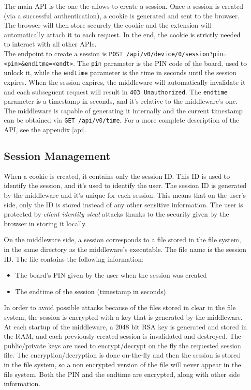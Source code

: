 The main API is the one the allows to create a session. Once a session is created (via a successful authentication), a cookie is generated and sent to the browser. The browser will then store securely the cookie and the extension will automatically attach it to each request. In the end, the cookie is strictly needed to interact with all other APIs.\\

The endpoint to create a session is \texttt{POST /api/v0/device/0/session?pin=<pin>\&enditme=<endt>}. The \texttt{pin} parameter is the PIN code of the board, used to unlock it, while the \texttt{endtime} parameter is the time in seconds until the session expires. When the session expires, the middleware will automatically invalidate it and each subseguent request will result in \texttt{403 Unauthorized}. The \texttt{endtime} parameter is a timestamp in seconds, and it's relative to the middleware's one. The middleware is capable of generating it internally and the current timestamp can be obtained via \texttt{GET /api/v0/time}. For a more complete description of the API, see the appendix \ref{api}.

\subsection{Session Management}
When a cookie is created, it contains only the session ID. This ID is used to identify the session, and it's used to identify the user. The session ID is generated by the middleware and it's unique for each session. This means that on the user's side, only the ID is stored instead of any other sensitive information. The user is protected by \textit{client identity steal} attacks thanks to the security given by the browser in storing it locally.

On the middleware side, a session corresponds to a file stored in the file system, in the same directory as the middleware's executable. The file name is the session ID. The file contains the following information:

\begin{itemize}
    \item The board's PIN given by the user when the session was created
    \item The endtime of the session (timestamp in seconds)
\end{itemize}

In order to avoid possible attacks because of the files stored in clear in the file system, the session is encrypted with a key that is generated by the middleware. At each startup of the middleware, a 2048 bit RSA key is generated and stored in the RAM, and each previously created session is invalidated and destroyed. The public/private keys are used to encrypt/decrypt on the fly the requested session file. The encryption/decryption is done on-the-fly and then the session is stored in the file system, so a non encrypted version of the file will never appear in the file system. Both the PIN and the endtime are encrypted, along with other side information.

